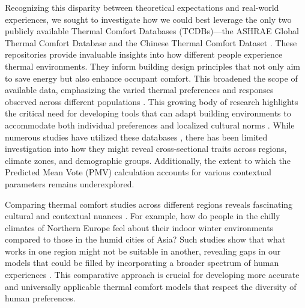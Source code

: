 \documentclass[final,3p,times,12pt]{elsarticle}
\begin{document}
Recognizing this disparity between theoretical expectations and real-world experiences, we sought to investigate how we could best leverage the only two publicly available Thermal Comfort Databases (TCDBs)—the ASHRAE Global Thermal Comfort Database \cite{foldvarylicinaDevelopmentASHRAEGlobal2018a} and the Chinese Thermal Comfort Dataset \cite{yangChineseThermalComfort2023}. These repositories provide invaluable insights into how different people experience thermal environments. They inform building design principles that not only aim to save energy but also enhance occupant comfort. This broadened the scope of available data, emphasizing the varied thermal preferences and responses observed across different populations \cite{yangResidentialThermalEnvironment2013}. This growing body of research highlights the critical need for developing tools that can adapt building environments to accommodate both individual preferences and localized cultural norms \cite{fengDatadrivenPersonalThermal2022,haghiradAdvancingPersonalThermal2024,wangRevisitingIndividualGroup2020a,karjalainenThermalComfortGender2012,wuMethodEvaluateBuilding2020}. While numerous studies have utilized these databases \cite{al-sharifPredictingThermalPreferences2024,duComparisonThermalComfort2022,liModifiedPredictedMean2025,yangComparativeAnalysisIndoor2024}, there has been limited investigation into how they might reveal cross-sectional traits across regions, climate zones, and demographic groups. Additionally, the extent to which the Predicted Mean Vote (PMV) calculation accounts for various contextual parameters remains underexplored.

Comparing thermal comfort studies across different regions reveals fascinating cultural and contextual nuances \cite{ghaniAssessmentThermalComfort2021,tungOutdoorThermalComfort2014}. For example, how do people in the chilly climates of Northern Europe feel about their indoor winter environments compared to those in the humid cities of Asia? Such studies show that what works in one region might not be suitable in another, revealing gaps in our models that could be filled by incorporating a broader spectrum of human experiences \cite{cheungAnalysisAccuracyPMV2019,lambertiDevelopmentComparisonAdaptive2023,schweikerInfluencePersonalityTraits2016}. This comparative approach is crucial for developing more accurate and universally applicable thermal comfort models that respect the diversity of human preferences.
\end{document}
